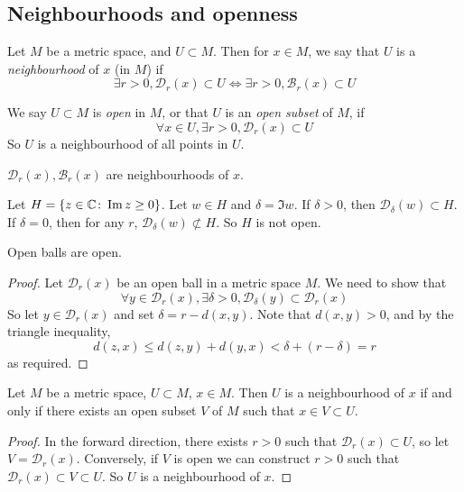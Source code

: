 \subsection{Neighbourhoods and openness}
\begin{definition}
	Let \( M \) be a metric space, and \( U \subset M \).
	Then for \( x \in M \), we say that \( U \) is a \textit{neighbourhood} of \( x \) (in \( M \)) if
	\[
		\exists r > 0, \mathcal D_r(x) \subset U \iff \exists r > 0, \mathcal B_r(x) \subset U
	\]
\end{definition}
\begin{definition}
	We say \( U \subset M \) is \textit{open} in \( M \), or that \( U \) is an \textit{open subset} of \( M \), if
	\[
		\forall x \in U, \exists r > 0, \mathcal D_r(x) \subset U
	\]
	So \( U \) is a neighbourhood of all points in \( U \).
\end{definition}
\begin{example}
	\( \mathcal D_r(x), \mathcal B_r(x) \) are neighbourhoods of \( x \).
\end{example}
\begin{example}
	Let \( H = \qty{ z \in \mathbb C \colon \Im z \geq 0 } \).
	Let \( w \in H \) and \( \delta = \Im w \).
	If \( \delta > 0 \), then \( \mathcal D_\delta(w) \subset H \).
	If \( \delta = 0 \), then for any \( r \), \( \mathcal D_\delta(w) \not\subset H \).
	So \( H \) is not open.
\end{example}
\begin{lemma}
	Open balls are open.
\end{lemma}
\begin{proof}
	Let \( \mathcal D_r(x) \) be an open ball in a metric space \( M \).
	We need to show that
	\[
		\forall y \in \mathcal D_r(x), \exists \delta > 0, \mathcal D_\delta(y) \subset \mathcal D_r(x)
	\]
	So let \( y \in \mathcal D_r(x) \) and set \( \delta = r - d(x,y) \).
	Note that \( d(x,y) > 0 \), and by the triangle inequality,
	\[
		d(z,x) \leq d(z,y) + d(y,x) < \delta + (r-\delta) = r
	\]
	as required.
\end{proof}
\begin{corollary}
	Let \( M \) be a metric space, \( U \subset M \), \( x \in M \).
	Then \( U \) is a neighbourhood of \( x \) if and only if there exists an open subset \( V \) of \( M \) such that \( x \in V \subset U \).
\end{corollary}
\begin{proof}
	In the forward direction, there exists \( r > 0 \) such that \( \mathcal D_r(x) \subset U \), so let \( V = \mathcal D_r(x) \).
	Conversely, if \( V \) is open we can construct \( r > 0 \) such that \( \mathcal D_r(x) \subset V \subset U \).
	So \( U \) is a neighbourhood of \( x \).
\end{proof}

